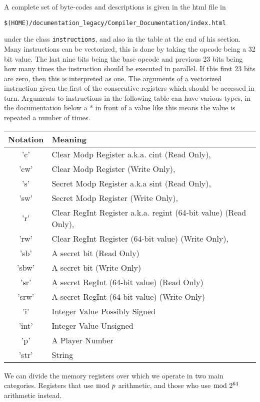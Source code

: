 A complete set of byte-codes and descriptions is
given in the html file in
\begin{center}
   \verb+$(HOME)/documentation_legacy/Compiler_Documentation/index.html+
\end{center}
under the class \verb+instructions+, and also in the table at the
end of his section.
Many instructions can be vectorized, this is done by taking the opcode
being a 32 bit value. The last nine bits being the base opcode and previous
23 bits being how many times the instruction should be executed in
parallel. If this first 23 bits are zero, then this is interpreted as
one. The arguments of a vectorized instruction given the first
of the consecutive registers which should be accessed in turn.
Arguments to instructions in the following table can have various types,
in the documentation below a * in front of a value like this means
the value is repeated a number of times.
\begin{center}
\begin{tabular}{|c|l|}
\hline
Notation  & Meaning \\
\hline
    'c'   & Clear Modp Register a.k.a. cint (Read Only), \\
    'cw'  & Clear Modp Register (Write Only), \\
    's'   & Secret Modp Register a.k.a sint (Read Only), \\
    'sw'  & Secret Modp Register (Write Only), \\
    'r'   & Clear RegInt Register a.k.a. regint (64-bit value) (Read Only), \\
    'rw'  & Clear RegInt Register (64-bit value) (Write Only), \\
    'sb'  & A secret bit (Read Only) \\
    'sbw' & A secret bit (Write Only) \\
    'sr'  & A secret RegInt (64-bit value) (Read Only) \\
    'srw' & A secret RegInt (64-bit value) (Write Only) \\
    'i'   & Integer Value Possibly Signed \\
    'int' & Integer Value Unsigned \\
    'p'   & A Player Number \\
    'str' & String \\
\hline
\end{tabular}
\end{center}
We can divide the memory registers over which we operate in two main categories.
Registers that use $\bmod \; p$ arithmetic, and those who use $\bmod \; 2^{64}$ arithmetic instead.
